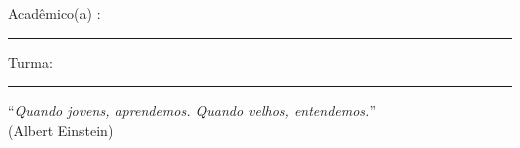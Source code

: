 \documentclass[12pt]{article}
\begin{document}
\begin{large}
\begin{center}

\end{center}
\end{large} 

\vskip 0.2cm Acad\^emico(a) : \rule{10cm}{0.5pt} Turma:  \rule{1cm}{0.5pt}

\pagestyle{empty}

\begin{flushright}
``\textit{Quando jovens, \/aprendemos.
Quando velhos,  \/entendemos.}''\\ (Albert Einstein)
\end{flushright}
\end{document}
